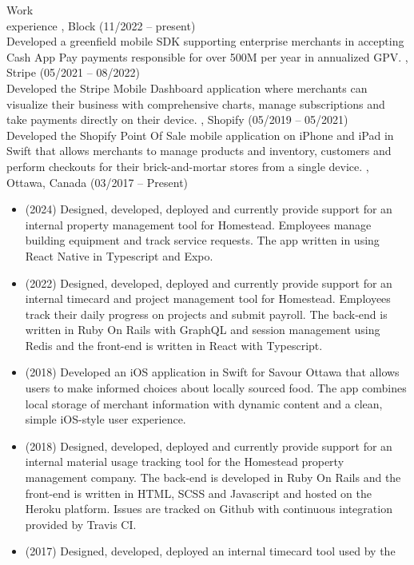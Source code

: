 \documentclass{resume}
\begin{document}
\begin{category}{Work \\experience}
, Block (11/2022 -- present)\\
Developed a greenfield mobile SDK supporting enterprise merchants in accepting Cash App
Pay payments responsible for over 500M per year in annualized GPV.
, Stripe (05/2021 -- 08/2022)\\
Developed the Stripe Mobile Dashboard application where merchants can visualize their business
with comprehensive charts, manage subscriptions and take payments
directly on their device.
, Shopify (05/2019 -- 05/2021)\\
Developed the Shopify Point Of Sale mobile application on iPhone and iPad in Swift that
allows merchants to manage products and inventory, customers and perform checkouts for
their brick-and-mortar stores from a single device.
, Ottawa, Canada (03/2017 -- Present)
\begin{itemize}
  \item (2024) Designed, developed, deployed and currently provide support for an internal
    property management tool for Homestead. Employees manage building equipment and track
    service requests. The app written in using React Native in Typescript and Expo.
  \item (2022) Designed, developed, deployed and currently provide support for an internal
    timecard and project management tool for Homestead. Employees track their daily progress
    on projects and submit payroll. The back-end is written in Ruby On Rails with GraphQL and
    session management using Redis and the front-end is written in React with Typescript.
  \item (2018) Developed an iOS application in Swift for Savour Ottawa that allows
    users to make informed choices about locally sourced food. The app combines
    local storage of merchant information with dynamic content and a clean,
    simple iOS-style user experience.
  \item (2018) Designed, developed, deployed and currently provide support for an
    internal material usage tracking tool for the Homestead property management
    company. The back-end is developed in Ruby On Rails and the front-end is written
    in HTML, SCSS and Javascript and hosted on the Heroku platform. Issues are tracked
    on Github with continuous integration provided by Travis CI.
  \item (2017) Designed, developed, deployed an internal timecard tool used by the

\end{itemize}
\end{category}
\end{document}
